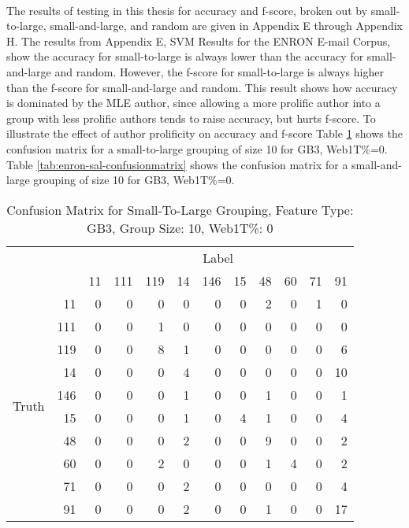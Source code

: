 	\paragraph*{} The results of testing in this thesis for accuracy and f-score, broken out by small-to-large, small-and-large, and random are given in Appendix E through Appendix H.  The results from Appendix E, SVM Results for the ENRON E-mail Corpus, show the accuracy for small-to-large is always lower than the accuracy for small-and-large and random.  However, the f-score for small-to-large is always higher than the f-score for small-and-large and random.  This result shows how accuracy is dominated by the MLE author, since allowing a more prolific author into a group with less prolific authors tends to raise accuracy, but hurts f-score. To illustrate the effect of author prolificity on accuracy and f-score Table \ref{tab:enron-stl-confusionmatrix} shows the confusion matrix for a small-to-large grouping of size 10 for GB3, Web1T\%=0.  Table \ref{tab:enron-sal-confusionmatrix} shows the confusion matrix for a small-and-large grouping of size 10 for GB3, Web1T\%=0. 
	
	\begin{table}[htbp!]
	\begin{center}
			\begin{tabular}{ | c | r | r | r | r | r | r | r | r | r| r | r |}
			\cline{3-12}
			\multicolumn{2}{c}{} & \multicolumn{10}{|c|}{Label}\\ \cline{3-12}
			\multicolumn{2}{c|}{} & 11 & 111 & 119 & 14 & 146 & 15 & 48 & 60 & 71 & 91\\ \hline 
			\multirow{10}{*}{\begin{sideways}Truth\end{sideways}} & 11 & 0 & 0 & 0 & 0 & 0 & 0 & 2 & 0 & 1 & 0\\ \cline{2-12}
			& 111 & 0 & 0 & 1 & 0 & 0 & 0 & 0 & 0 & 0 & 0\\ \cline{2-12} 
			& 119 & 0 & 0 & 8 & 1 & 0 & 0 & 0 & 0 & 0 & 6\\ \cline{2-12} 
			& 14 & 0 & 0 & 0 & 4 & 0 & 0 & 0 & 0 & 0 & 10\\ \cline{2-12} 
			& 146 & 0 & 0 & 0 & 1 & 0 & 0 & 1 & 0 & 0 & 1\\ \cline{2-12} 
			& 15 & 0 & 0 & 0 & 1 & 0 & 4 & 1 & 0 & 0 & 4\\ \cline{2-12} 
			& 48 & 0 & 0 & 0 & 2 & 0 & 0 & 9 & 0 & 0 & 2\\ \cline{2-12} 
			& 60 & 0 & 0 & 2 & 0 & 0 & 0 & 1 & 4 & 0 & 2\\ \cline{2-12} 
			& 71 & 0 & 0 & 0 & 2 & 0 & 0 & 0 & 0 & 0 & 4\\ \cline{2-12} 
			& 91 & 0 & 0 & 0 & 2 & 0 & 0 & 1 & 0 & 0 & 17\\ \hline
	\end{tabular}
		\caption{Confusion Matrix for Small-To-Large Grouping, Feature Type: GB3, Group Size: 10, Web1T\%: 0}
		\label{tab:enron-stl-confusionmatrix}
		\end{center}	
	\end{table}
	
